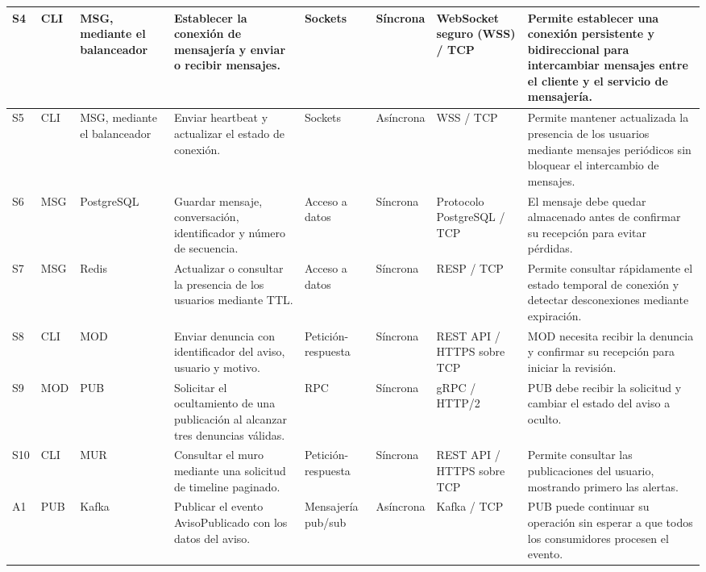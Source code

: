 \documentclass[12pt,a4paper]{article}
\begin{document}
\begin{landscape}
\begin{longtable}{
|p{0.7cm}
|p{2.1cm}
|p{2.1cm}
|p{3.5cm}
|p{1.7cm}
|p{1.7cm}
|p{2.8cm}
|p{5.0cm}|}
S4 & CLI & MSG, mediante el balanceador &
Establecer la conexión de mensajería y enviar o recibir mensajes. &
Sockets & Síncrona &
WebSocket seguro (WSS) / TCP &
Permite establecer una conexión persistente y bidireccional para intercambiar mensajes entre el cliente y el servicio de mensajería. \\
\hline

S5 & CLI & MSG, mediante el balanceador &
Enviar heartbeat y actualizar el estado de conexión. &
Sockets & Asíncrona &
WSS / TCP &
Permite mantener actualizada la presencia de los usuarios mediante mensajes periódicos sin bloquear el intercambio de mensajes. \\
\hline

S6 & MSG & PostgreSQL &
Guardar mensaje, conversación, identificador y número de secuencia. &
Acceso a datos & Síncrona &
Protocolo PostgreSQL / TCP &
El mensaje debe quedar almacenado antes de confirmar su recepción para evitar pérdidas. \\
\hline

S7 & MSG & Redis &
Actualizar o consultar la presencia de los usuarios mediante TTL. &
Acceso a datos & Síncrona &
RESP / TCP &
Permite consultar rápidamente el estado temporal de conexión y detectar desconexiones mediante expiración. \\
\hline

S8 & CLI & MOD &
Enviar denuncia con identificador del aviso, usuario y motivo. &
Petición-respuesta & Síncrona &
REST API / HTTPS sobre TCP &
MOD necesita recibir la denuncia y confirmar su recepción para iniciar la revisión. \\
\hline

S9 & MOD & PUB &
Solicitar el ocultamiento de una publicación al alcanzar tres denuncias válidas. &
RPC & Síncrona &
gRPC / HTTP/2 &
PUB debe recibir la solicitud y cambiar el estado del aviso a oculto. \\
\hline

S10 & CLI & MUR &
Consultar el muro mediante una solicitud de timeline paginado. &
Petición-respuesta & Síncrona &
REST API / HTTPS sobre TCP &
Permite consultar las publicaciones del usuario, mostrando primero las alertas. \\
\hline

A1 & PUB & Kafka &
Publicar el evento AvisoPublicado con los datos del aviso. &
Mensajería pub/sub & Asíncrona &
Kafka / TCP &
PUB puede continuar su operación sin esperar a que todos los consumidores procesen el evento. \\
\hline


\end{longtable}
\end{landscape}
\end{document}
